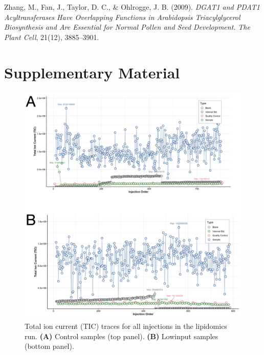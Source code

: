 \documentclass[10pt,letterpaper]{article}
\newcommand{\beginsupplement}{%
  \setcounter{table}{0}%
  \renewcommand{\thetable}{S\arabic{table}}%
  \setcounter{figure}{0}%
  \renewcommand{\thefigure}{S\arabic{figure}}}
\begin{document}
\begin{itemize}
\begin{thebibliography}{10}
Zhang, M., Fan, J., Taylor, D. C., \& Ohlrogge, J. B. (2009).  
\emph{DGAT1 and PDAT1 Acyltransferases Have Overlapping Functions in Arabidopsis Triacylglycerol Biosynthesis and Are Essential for Normal Pollen and Seed Development.}  
\textit{The Plant Cell}, 21(12), 3885–3901.

\end{thebibliography}

\FloatBarrier
\section*{Supplementary Material}
\beginsupplement


\begin{figure}[htp]
  \centering
  \includegraphics[width=\textwidth]{fig/supp/SuppFig1.png}
  \caption{
    Total ion current (TIC) traces for all injections in the lipidomics run. 
    {\bf(A)} Control samples (top panel). 
    {\bf(B)} Lowinput samples (bottom panel).
  }
  \label{fig:S1}
\end{figure}




\end{itemize}
\end{document}
